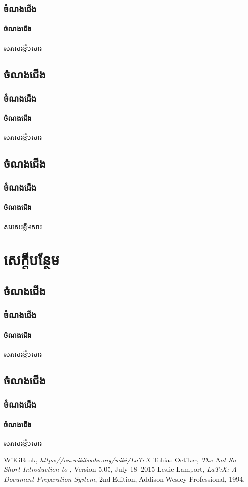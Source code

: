 \documentclass[12pt,a4paper]{colorbook}
\begin{document}
	\section{ចំណងជើង}
	\subsection{ចំណងជើង}
	សរសេរខ្លឹមសារ
	\chapter{ចំណងជើង}
	\section{ចំណងជើង}
	\subsection{ចំណងជើង}
	សរសេរខ្លឹមសារ
	\chapter{ចំណងជើង}
	\section{ចំណងជើង}
	\subsection{ចំណងជើង}
	សរសេរខ្លឹមសារ
	\appendix
	\part{សេក្ដីបន្ថែម}
	\chapter{ចំណងជើង}
	\section{ចំណងជើង}
	\subsection{ចំណងជើង}
	សរសេរខ្លឹមសារ
	\chapter{ចំណងជើង}
	\section{ចំណងជើង}
	\subsection{ចំណងជើង}
	សរសេរខ្លឹមសារ
	\backmatter
	\begin{thebibliography}{9}
		 WiKiBook, \emph{https://en.wikibooks.org/wiki/LaTeX}
		 Tobias Oetiker, \emph{The Not So Short Introduction to \LaTeXe}, Version 5.05, July 18, 2015
		 Leslie Lamport, \emph{\LaTeX: A Document Preparation System}, 2nd Edition, Addison-Wesley Professional, 1994.
	\end{thebibliography}
\end{document}
